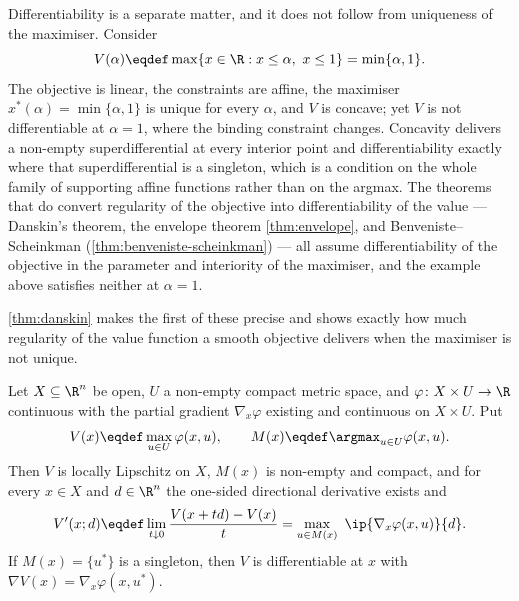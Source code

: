Differentiability is a separate matter, and it does not follow from uniqueness of
the maximiser. Consider
\[
	V(\alpha)\eqdef\max\{x\in\R : x\leq\alpha,\ x\leq1\}=\min\{\alpha,1\}.
\]
The objective is linear, the constraints are affine, the maximiser
$x^\ast(\alpha)=\min\{\alpha,1\}$ is unique for every $\alpha$, and $V$ is
concave; yet $V$ is not differentiable at $\alpha=1$, where the binding
constraint changes. Concavity delivers a non-empty superdifferential at every
interior point and differentiability exactly where that superdifferential is a
singleton, which is a condition on the whole family of supporting affine
functions rather than on the argmax. The theorems that do convert regularity of
the objective into differentiability of the value --- Danskin's theorem, the
envelope theorem \autoref{thm:envelope}, and Benveniste--Scheinkman
(\autoref{thm:benveniste-scheinkman}) --- all assume differentiability of the objective in the
parameter and interiority of the maximiser, and the example above satisfies
neither at $\alpha=1$.

\autoref{thm:danskin} makes the first of these precise and shows exactly how much
regularity of the value function a smooth objective delivers when the maximiser
is not unique.

\begin{theorem}[Danskin]\label{thm:danskin}
	Let $X\subseteq\R^{n}$ be open, $U$ a non-empty compact metric space, and
	$\varphi\colon X\times U\to\R$ continuous with the partial gradient
	$\nabla_{x}\varphi$ existing and continuous on $X\times U$. Put
	\[
		V(x)\eqdef\max_{u\in U}\varphi(x,u),
		\qquad M(x)\eqdef\argmax_{u\in U}\varphi(x,u).
	\]
	Then $V$ is locally Lipschitz on $X$, $M(x)$ is non-empty and compact, and for
	every $x\in X$ and $d\in\R^{n}$ the one-sided directional derivative exists and
	\begin{equation}\label{eq:danskin}
		V'(x;d)\eqdef\lim_{t\downarrow0}\frac{V(x+td)-V(x)}{t}
		=\max_{u\in M(x)}\ \ip{\nabla_{x}\varphi(x,u)}{d} .
	\end{equation}
	If $M(x)=\{u^{\ast}\}$ is a singleton, then $V$ is differentiable at $x$ with
	$\nabla V(x)=\nabla_{x}\varphi(x,u^{\ast})$.
\end{theorem}

